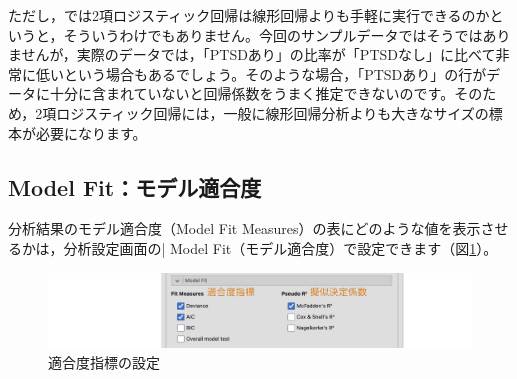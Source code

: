 \documentclass[
  12pt,
  a5jpaper,
  lualatex, ja=standard]{bxjsbook}
\begin{document}
ただし，では2項ロジスティック回帰は線形回帰よりも手軽に実行できるのかというと，そういうわけでもありません。今回のサンプルデータではそうではありませんが，実際のデータでは，「PTSDあり」の比率が「PTSDなし」に比べて非常に低いという場合もあるでしょう。そのような場合，「PTSDあり」の行がデータに十分に含まれていないと回帰係数をうまく推定できないのです。そのため，2項ロジスティック回帰には，一般に線形回帰分析よりも大きなサイズの標本が必要になります。

\hypertarget{sub:regression-binomial-model-fit}{%
\subsection{Model Fit：モデル適合度}\label{sub:regression-binomial-model-fit}}

分析結果のモデル適合度（Model Fit Measures）の表にどのような値を表示させるかは，分析設定画面の\colorbox{bar}{\textcolor{gmoji2}{| Model Fit}}（モデル適合度）で設定できます（図\ref{fig:regression-binomial-model-fit}）。

\begin{figure}[!ht]

{\centering \includegraphics[width=1\linewidth]{images/regression/binomial-model-fit} 

}

\caption{適合度指標の設定}\label{fig:regression-binomial-model-fit}
\end{figure}
\end{document}
